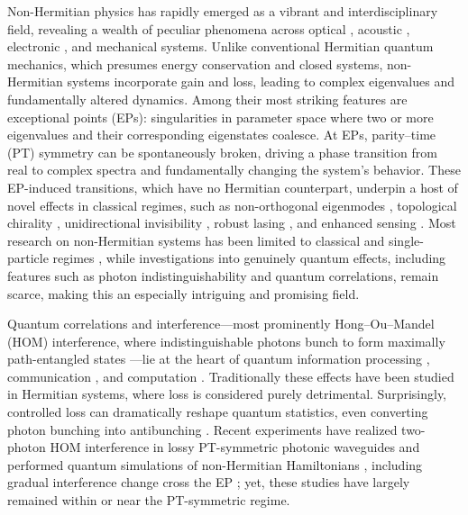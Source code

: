 \documentclass[%
reprint,
superscriptaddress,
amsthm,amsmath,amssymb,
aps,
]{revtex4-1}
\begin{document}
Non-Hermitian physics has rapidly emerged as a vibrant and interdisciplinary field, revealing a wealth of peculiar phenomena across optical \cite{ozdemir2019parity,feng2017non,miri2019exceptional,el2018non}, acoustic \cite{tang2020exceptional}, electronic \cite{assawaworrarit2017robust,zhao2024exceptional}, and mechanical \cite{xu2016topological,wu2023chip} systems. Unlike conventional Hermitian quantum mechanics, which presumes energy conservation and closed systems, non-Hermitian systems incorporate gain and loss, leading to complex eigenvalues and fundamentally altered dynamics. Among their most striking features are exceptional points (EPs): singularities in parameter space where two or more eigenvalues and their corresponding eigenstates coalesce. At EPs, parity–time (PT) symmetry can be spontaneously broken, driving a phase transition from real to complex spectra and fundamentally changing the system’s behavior. These EP-induced transitions, which have no Hermitian counterpart, underpin a host of novel effects in classical regimes, such as non-orthogonal eigenmodes \cite{ruter2010observation,ching1998quasinormal}, topological chirality \cite{zeuner2015observation,weimann2017topologically}, unidirectional invisibility \cite{doppler2016dynamically}, robust lasing \cite{hodaei2014parity,feng2014single}, and enhanced sensing \cite{hodaei2017enhanced,chen2017exceptional}. Most research on non-Hermitian systems has been limited to classical and single-particle regimes \cite{lu2025quantum}, while investigations into genuinely quantum effects, including features such as photon indistinguishability and quantum correlations, remain scarce, making this an especially intriguing and promising field.

Quantum correlations and interference—most prominently Hong–Ou–Mandel (HOM) interference, where indistinguishable photons bunch to form maximally path-entangled states \cite{hong1987measurement}—lie at the heart of quantum information processing \cite{bouwmeester1997experimental}, communication \cite{lo2012measurement}, and computation \cite{hangleiter2023computational}. Traditionally these effects have been studied in Hermitian systems, where loss is considered purely detrimental. Surprisingly, controlled loss can dramatically reshape quantum statistics, even converting photon bunching into antibunching \cite{vest2017anti,hong2024loss,li2021non}. Recent experiments have realized two-photon HOM interference in lossy PT-symmetric photonic waveguides \cite{klauck2019observation,ehrhardt2022observation,klauck2025crossing,wolterink2023order} and performed quantum simulations of non-Hermitian Hamiltonians \cite{maraviglia2022photonic}, including gradual interference change cross the EP \cite{klauck2025crossing}; yet, these studies have largely remained within or near the PT-symmetric regime.
\end{document}
